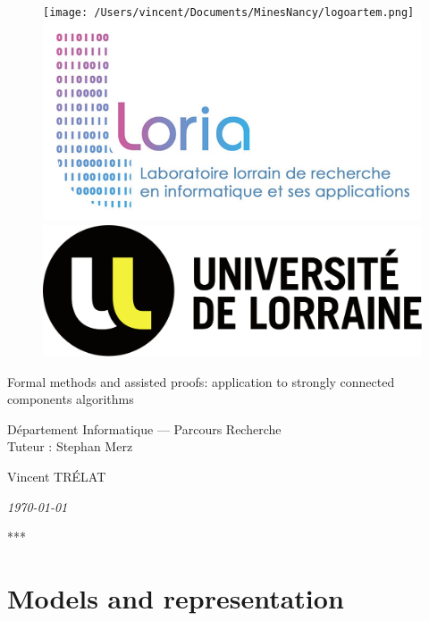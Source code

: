 \documentclass[a4 paper, 12pt]{article}
\begin{document}
\begin{titlepage}
    \begin{figure}[!h]
        \centering
        \texttt{[image: /Users/vincent/Documents/MinesNancy/logoartem.png]}
        \hspace{1cm}
        \includegraphics[height = .1\textwidth]{img/logoloria.jpg}
        \hspace{1cm}
        \includegraphics[height = .1\textwidth]{img/logoUL.png}
    \end{figure}
    \vspace{3cm}

    \begin{center}
        \huge{Formal methods and assisted proofs: application to strongly connected components algorithms}
    \end{center}
    \vspace{1cm}
    \begin{center}
        \large{Département Informatique --- Parcours Recherche \\ Tuteur : Stephan Merz}
    \end{center}
    \vspace{1 cm}
    \begin{center}
        Vincent TRÉLAT
    \end{center}
    \vspace{2 cm}
    \begin{center}
        \textit{\today}
    \end{center}
    \vspace{2 cm}
    \begin{center}
        ***
    \end{center}
    
\end{titlepage}
\restoregeometry
\tableofcontents
\pagebreak

\section{Models and representation}
\end{document}
